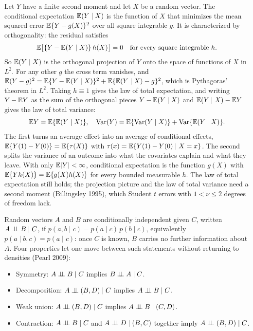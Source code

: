 Let $Y$ have a finite second moment and let $X$ be a random vector. The conditional expectation $\mathbb{E}(Y \mid X)$ is the function of $X$ that minimizes the mean squared error $\mathbb{E}\{Y - g(X)\}^2$ over all square integrable $g$. It is characterized by orthogonality: the residual satisfies
\[
\mathbb{E}\bigl[\{Y - \mathbb{E}(Y \mid X)\}\,h(X)\bigr] = 0 \quad \text{for every square integrable } h.
\]
So $\mathbb{E}(Y \mid X)$ is the orthogonal projection of $Y$ onto the space of functions of $X$ in $L^2$. For any other $g$ the cross term vanishes, and $\mathbb{E}(Y - g)^2 = \mathbb{E}\{Y - \mathbb{E}(Y \mid X)\}^2 + \mathbb{E}\{\mathbb{E}(Y \mid X) - g\}^2$, which is Pythagoras' theorem in $L^2$. Taking $h \equiv 1$ gives the law of total expectation, and writing $Y - \mathbb{E} Y$ as the sum of the orthogonal pieces $Y - \mathbb{E}(Y \mid X)$ and $\mathbb{E}(Y \mid X) - \mathbb{E} Y$ gives the law of total variance:
\[
\mathbb{E} Y = \mathbb{E}\{\mathbb{E}(Y \mid X)\}, \quad \mathrm{Var}(Y) = \mathbb{E}\{\mathrm{Var}(Y \mid X)\} + \mathrm{Var}\{\mathbb{E}(Y \mid X)\}.
\]
The first turns an average effect into an average of conditional effects, $\mathbb{E}\{Y(1) - Y(0)\} = \mathbb{E}\{\tau(X)\}$ with $\tau(x) = \mathbb{E}\{Y(1) - Y(0) \mid X = x\}$. The second splits the variance of an outcome into what the covariates explain and what they leave. With only $\mathbb{E}|Y| < \infty$, conditional expectation is the function $g(X)$ with $\mathbb{E}\{Yh(X)\} = \mathbb{E}\{g(X)h(X)\}$ for every bounded measurable $h$. The law of total expectation still holds; the projection picture and the law of total variance need a second moment (Billingsley 1995), which Student $t$ errors with $1 < \nu \le 2$ degrees of freedom lack.

Random vectors $A$ and $B$ are conditionally independent given $C$, written $A \perp\!\!\!\perp B \mid C$, if $p(a, b \mid c) = p(a \mid c)\,p(b \mid c)$, equivalently $p(a \mid b, c) = p(a \mid c)$: once $C$ is known, $B$ carries no further information about $A$. Four properties let one move between such statements without returning to densities (Pearl 2009):
\begin{itemize}
\item Symmetry: $A \perp\!\!\!\perp B \mid C$ implies $B \perp\!\!\!\perp A \mid C$.
\item Decomposition: $A \perp\!\!\!\perp (B, D) \mid C$ implies $A \perp\!\!\!\perp B \mid C$.
\item Weak union: $A \perp\!\!\!\perp (B, D) \mid C$ implies $A \perp\!\!\!\perp B \mid (C, D)$.
\item Contraction: $A \perp\!\!\!\perp B \mid C$ and $A \perp\!\!\!\perp D \mid (B, C)$ together imply $A \perp\!\!\!\perp (B, D) \mid C$.
\end{itemize}

